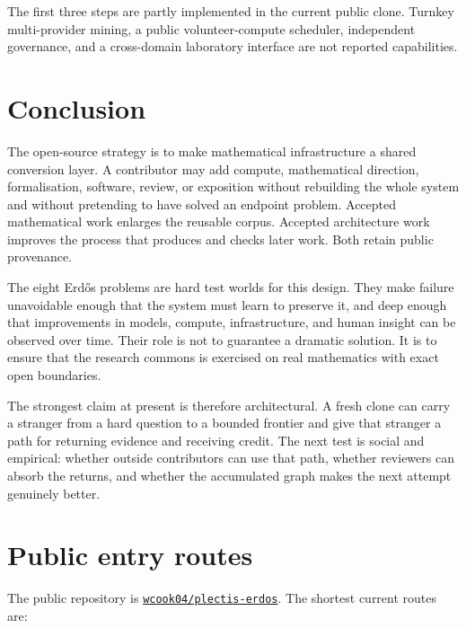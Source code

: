 \documentclass[10pt]{article}
\newcommand{\repobase}{https://github.com/wcook04/plectis-erdos}
\begin{document}
The first three steps are partly implemented in the current public clone.
Turnkey multi-provider mining, a public volunteer-compute scheduler,
independent governance, and a cross-domain laboratory interface are not
reported capabilities.

\section{Conclusion}\label{sec:conclusion}

The open-source strategy is to make mathematical infrastructure a shared
conversion layer.  A contributor may add compute, mathematical direction,
formalisation, software, review, or exposition without rebuilding the whole
system and without pretending to have solved an endpoint problem.  Accepted
mathematical work enlarges the reusable corpus.  Accepted architecture work
improves the process that produces and checks later work.  Both retain public
provenance.

The eight Erd\H{o}s problems are hard test worlds for this design.  They make
failure unavoidable enough that the system must learn to preserve it, and
deep enough that improvements in models, compute, infrastructure, and human
insight can be observed over time.  Their role is not to guarantee a dramatic
solution.  It is to ensure that the research commons is exercised on real
mathematics with exact open boundaries.

The strongest claim at present is therefore architectural.  A fresh clone can
carry a stranger from a hard question to a bounded frontier and give that
stranger a path for returning evidence and receiving credit.  The next test is
social and empirical: whether outside contributors can use that path, whether
reviewers can absorb the returns, and whether the accumulated graph makes the
next attempt genuinely better.

\appendix
\section{Public entry routes}\label{app:routes}

The public repository is \href{\repobase}{\texttt{wcook04/plectis-erdos}}.
The shortest current routes are:
\end{document}
